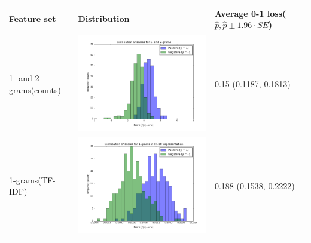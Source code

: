 \documentclass[paper=a4, fontsize=11pt]{scrartcl} %
\numberwithin{equation}{section} %
\numberwithin{figure}{section} %
\numberwithin{table}{section} %
\begin{document}
\begin{center}
\begin{tabular}{| m{3cm} | m{8cm} | m{3cm} |}
\hline
	\textbf{Feature set} & \textbf{Distribution} & \textbf{Average 0-1 loss}\newline($\hat{p}, \hat{p} \pm 1.96 \cdot SE$) \\
\hline
	1- and 2-grams\newline(counts) & \includegraphics[scale=0.4]{./../figures/8_2_a.png} & 0.15 \newline (0.1187, 0.1813) \\
\hline
	1-grams\newline(TF-IDF) & \includegraphics[scale=0.4]{./../figures/8_2_b.png} & 0.188 \newline (0.1538, 0.2222) \\

\end{tabular}
\end{center}
\end{document}
